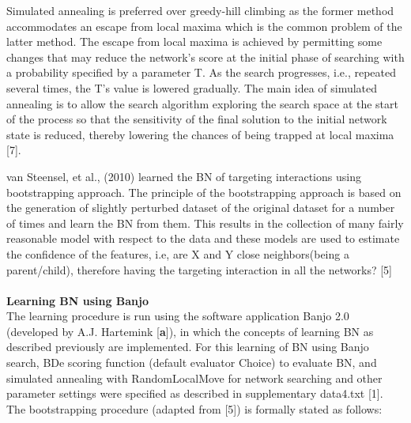 \documentclass{bioinfo}
\begin{document}
\begin{methods}
Simulated annealing is preferred over greedy-hill climbing as the former method accommodates an escape from local maxima which is the common problem of the latter method. The escape from local maxima is achieved by permitting some changes that may reduce the network's score at the initial phase of searching  with a probability specified by a parameter T. As the search progresses, i.e., repeated several times, the T's value is lowered gradually. The main idea of simulated annealing is to allow the search algorithm exploring the search space at the start of the process so that the sensitivity of the final solution to the initial network state is reduced, thereby lowering the chances of being trapped at local maxima [7].

van Steensel, et al., (2010) learned the BN of targeting interactions using bootstrapping approach. The principle of the bootstrapping approach is based on the generation of slightly perturbed dataset of the original dataset for a number of times and learn the BN from them. This results in the collection of many fairly reasonable model with respect to the data and these models are used to estimate the confidence of the features, i.e, are X and Y close neighbors(being a parent/child), therefore having the targeting interaction in all the networks? [5]\\
\\
\textbf{Learning BN using Banjo}\\
The learning procedure is run using the software application Banjo 2.0 (developed by A.J. Hartemink [\textbf{a}]), in which the concepts of learning BN as described previously are implemented. For this learning of BN using Banjo search, BDe scoring function (default evaluator Choice) to evaluate BN, and simulated annealing with RandomLocalMove for network searching and other parameter settings were specified as described in supplementary data4.txt [1].
The bootstrapping procedure (adapted from [5]) is formally stated as follows:


\end{methods}
\end{document}
